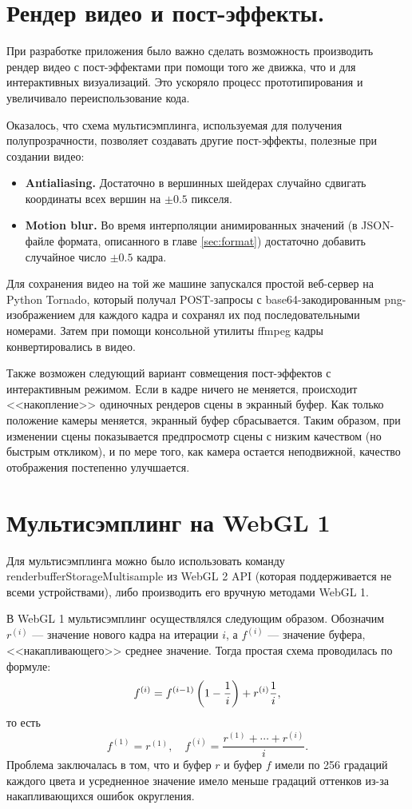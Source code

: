 \section{Рендер видео и пост-эффекты.}

При разработке приложения было важно сделать возможность производить рендер видео с пост-эффектами при помощи того же движка, что и для интерактивных визуализаций. Это ускоряло процесс прототипирования и увеличивало переиспользование кода.

Оказалось, что схема мультисэмплинга, используемая для получения полупрозрачности, позволяет создавать другие пост-эффекты, полезные при создании видео:

\begin{itemize}
\item {\bfseries Antialiasing.} Достаточно в вершинных шейдерах случайно сдвигать координаты всех вершин на $\pm 0.5$ пикселя.
\item {\bfseries Motion blur.} Во время интерполяции анимированных значений (в JSON-файле формата, описанного в главе \ref{sec:format}) достаточно добавить случайное число $\pm 0.5$ кадра.
\end{itemize}

Для сохранения видео на той же машине запускался простой веб-сервер на Python Tornado, который получал POST-запросы с base64-закодированным png-изображением для каждого кадра и сохранял их под последовательными номерами. Затем при помощи консольной утилиты ffmpeg кадры конвертировались в видео.

Также возможен следующий вариант совмещения пост-эффектов с интерактивным режимом. Если в кадре ничего не меняется, происходит <<накопление>> одиночных рендеров сцены в экранный буфер. Как только положение камеры меняется, экранный буфер сбрасывается. Таким образом, при изменении сцены показывается предпросмотр сцены с низким качеством (но быстрым откликом), и по мере того, как камера остается неподвижной, качество отображения постепенно улучшается. 

\section{Мультисэмплинг на WebGL 1}

Для мультисэмплинга можно было использовать команду renderbufferStorageMultisample из WebGL 2 API (которая поддерживается не всеми устройствами), либо производить его вручную методами WebGL 1.

В WebGL 1 мультисэмплинг осуществлялся следующим образом. Обозначим $r^{(i)}$ --- значение нового кадра на итерации $i$, а $f^{(i)}$ --- значение буфера, <<накапливающего>> среднее значение. Тогда простая схема проводилась по формуле:
$$f^{(i)} = f^{(i-1)} \left(1 - \frac{1}{i}\right) + r^{(i)} \frac{1}{i},$$
то есть
$$f^{(1)} = r^{(1)},\quad f^{(i)} = \frac{r^{(1)} + \cdots + r^{(i)}}{i}.$$
Проблема заключалась в том, что и буфер $r$ и буфер $f$ имели по 256 градаций каждого цвета и усредненное значение имело меньше градаций оттенков из-за накапливающихся ошибок округления.

